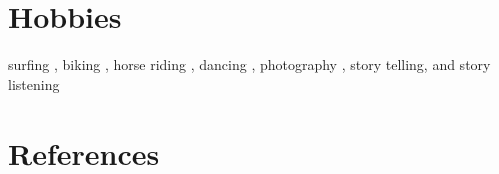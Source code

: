\documentclass[10pt, letter]{article}
\begin{document}
\vspace{-2em}\section*{\bf Hobbies}

surfing , biking , horse riding , dancing , photography , story telling, and story listening\\[.2cm]



\vspace{-2em}\section*{\bf References}

\end{document}
